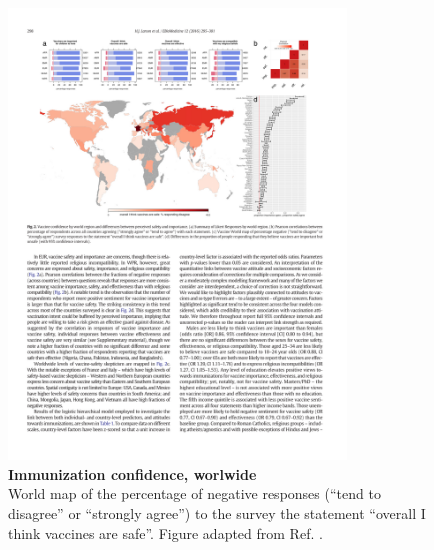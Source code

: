\begin{figure}[H]
	\centering	
	\includegraphics[width=0.8\textwidth, trim={0 0 0 4mm}, clip=true]{Figures/Vaccine/Fig_Larson2016}
	\caption[ Immunization confidence, worlwide]{%
		{\bf Immunization confidence, worlwide}\\
		World map of the percentage of negative responses (``tend to disagree'' or ``strongly agree'') to the survey the statement ``overall I think vaccines are safe''. Figure adapted from Ref. \cite[]{Larson2016}.}
	\label{fig:Vacc_FigLarson2016}
\end{figure}



